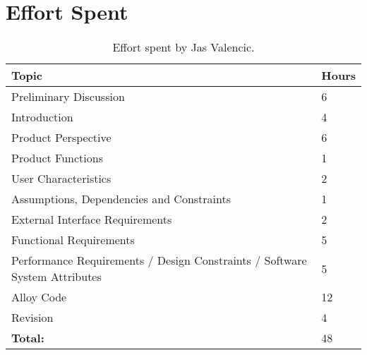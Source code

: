 \chapter{Effort Spent}

\begin{table}[H]
    \centering
    \begin{tabular}{| m{} | m{} |}
        \hline
        \textbf{Topic}                                                           & \textbf{Hours} \\
        \hline
        Preliminary Discussion                                                     & 6              \\
        \hline
        Introduction                                                               & 4              \\
        \hline
        Product Perspective                                                        & 6              \\
        \hline
        Product Functions                                                          & 1              \\
        \hline
        User Characteristics                                                       & 2              \\
        \hline
        Assumptions, Dependencies and Constraints                                  & 1              \\
        \hline
        External Interface Requirements                                            & 2              \\
        \hline
        Functional Requirements                                                    & 5              \\
        \hline
        Performance Requirements / Design Constraints / Software System Attributes & 5              \\
        \hline
        Alloy Code                                                                 & 12             \\
        \hline
        Revision                                                                   & 4              \\
        \hline
        \hline
        \textbf{Total:}                                                            & 48             \\
        \hline
    \end{tabular}
    \caption{Effort spent by Jas Valencic.}
\end{table}

